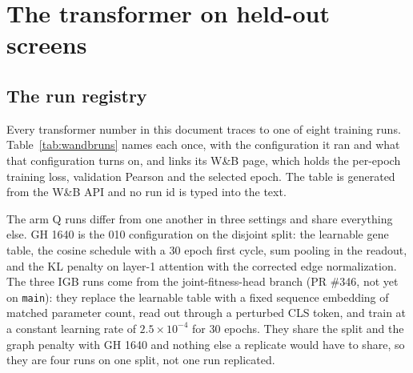 
\section{The transformer on held-out screens}
\label{sec:disjoint}

\subsection{The run registry}
\label{sec:registry}

Every transformer number in this document traces to one of eight training runs.
Table~\ref{tab:wandbruns} names each once, with the configuration it ran and what
that configuration turns on, and links its W\&B page, which holds the per-epoch
training loss, validation Pearson and the selected epoch. The table is generated
from the W\&B API and no run id is typed into the text.

\begin{table}[htbp]
\centering
\scriptsize
\caption{The run registry. The 010 checkpoints are arm R's reference and were scored
on the 010 test split by their own evaluation runs. GH 1598 and GH 1640 were stopped
by the 12 hour wall clock and have no test evaluation; GH 1640's epoch 7 checkpoint
was scored afterward on CPU. The IGB runs finished 30 epochs with no test
evaluation. The validation maximum is an upward-biased order statistic over the
logged epochs. Configs of the IGB runs are on branch
\texttt{feat/025-fitness-joint-head}.}
\label{tab:wandbruns}

\end{table}

The arm Q runs differ from one another in three settings and share everything
else. GH 1640 is the 010 configuration on the disjoint split: the learnable gene
table, the cosine schedule with a 30 epoch first cycle, sum pooling in the readout,
and the KL penalty on layer-1 attention with the corrected edge normalization. The
three IGB runs come from the joint-fitness-head branch (PR \#346, not yet on
\texttt{main}): they replace the learnable table with a fixed sequence embedding of
matched parameter count, read out through a perturbed CLS token, and train at a
constant learning rate of $2.5 \times 10^{-4}$ for 30 epochs. They share the split
and the graph penalty with GH 1640 and nothing else a replicate would have to
share, so they are four runs on one split, not one run replicated.

